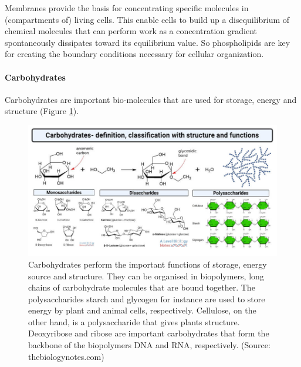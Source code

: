 \documentclass[
  11pt,
]{book}
\begin{document}
\pagebreak

Membranes provide the basis for concentrating specific molecules in (compartments of) living cells. This enable cells to build up a disequilibrium of chemical molecules that can perform work as a concentration gradient spontaneously dissipates toward its equilibrium value. So phospholipids are key for creating the boundary conditions necessary for cellular organization.

\hypertarget{carbohydrates}{%
\paragraph{Carbohydrates}\label{carbohydrates}}

Carbohydrates are important bio-molecules that are used for storage, energy and structure (Figure \ref{fig:carbohydrates}).

\begin{figure}

{\centering \includegraphics[width=1\linewidth]{./figs/Carbohydrates-definition-classification-with-structure-and-functions} 

}

\caption{Carbohydrates perform the important functions of storage, energy source and structure. They can be organised in biopolymers, long chains of carbohydrate molecules that are bound together. The polysaccharides starch and glycogen for instance are used to store energy by plant and animal cells, respectively. Cellulose, on the other hand, is a polysaccharide that gives plants structure. Deoxyribose and ribose are important carbohydrates that form the backbone of the biopolymers DNA and RNA, respectively. (Source: thebiologynotes.com)}\label{fig:carbohydrates}
\end{figure}
\end{document}

